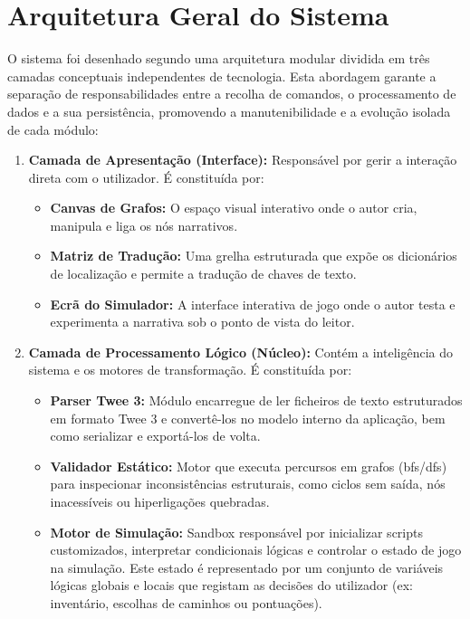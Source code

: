 \section{Arquitetura Geral do Sistema}
\label{sec:arquitetura-geral}
O sistema foi desenhado segundo uma arquitetura modular dividida em três camadas conceptuais independentes de tecnologia. Esta abordagem garante a separação de responsabilidades entre a recolha de comandos, o processamento de dados e a sua persistência, promovendo a manutenibilidade e a evolução isolada de cada módulo:
\begin{enumerate}
    \item \textbf{Camada de Apresentação (Interface):} Responsável por gerir a interação direta com o utilizador. É constituída por:
    \begin{itemize}
        \item \textbf{Canvas de Grafos:} O espaço visual interativo onde o autor cria, manipula e liga os nós narrativos.
        \item \textbf{Matriz de Tradução:} Uma grelha estruturada que expõe os dicionários de localização e permite a tradução de chaves de texto.
        \item \textbf{Ecrã do Simulador:} A interface interativa de jogo onde o autor testa e experimenta a narrativa sob o ponto de vista do leitor.
    \end{itemize}
    \item \textbf{Camada de Processamento Lógico (Núcleo):} Contém a inteligência do sistema e os motores de transformação. É constituída por:
    \begin{itemize}
        \item \textbf{Parser Twee 3:} Módulo encarregue de ler ficheiros de texto estruturados em formato Twee 3 e convertê-los no modelo interno da aplicação, bem como serializar e exportá-los de volta.
        \item \textbf{Validador Estático:} Motor que executa percursos em grafos (\gls{bfs}/\gls{dfs}) para inspecionar inconsistências estruturais, como ciclos sem saída, nós inacessíveis ou hiperligações quebradas.
        \item \textbf{Motor de Simulação:} Sandbox responsável por inicializar scripts customizados, interpretar condicionais lógicas e controlar o estado de jogo na simulação. Este estado é representado por um conjunto de variáveis lógicas globais e locais que registam as decisões do utilizador (ex: inventário, escolhas de caminhos ou pontuações).
    \end{itemize}

\end{enumerate}
